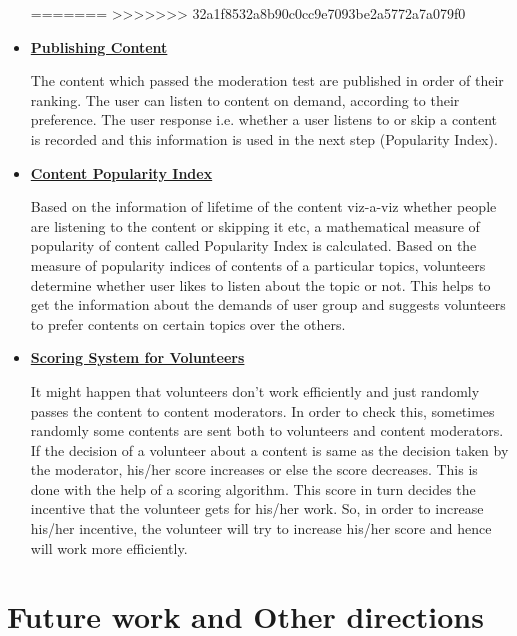 \documentclass[11pt]{article}
\begin{document}
\begin{itemize}
\begin{itemize}
		\end{itemize}
=======
>>>>>>> 32a1f8532a8b90c0cc9e7093be2a5772a7a079f0


			\item \textbf{\underline{Publishing Content}}


			The content which passed the moderation test are published in order of their ranking. The user can listen to content on demand, according to their preference. The user response i.e. whether a user listens to or skip a content is recorded and this information is used in the next step (Popularity Index).

\bigskip
			\item \textbf{\underline{Content Popularity Index}}


			Based on the information of lifetime of the content viz-a-viz whether people are listening to the content or skipping it etc, a mathematical measure of popularity of content called Popularity Index is calculated. Based on the measure of popularity indices of contents of a particular topics, volunteers determine whether user likes to listen about the topic or not. This helps to get the information about the demands of user group and suggests volunteers to prefer contents on certain topics over the others.


			\item \textbf{\underline{Scoring System for Volunteers}}


			It might happen that volunteers don't work efficiently and just randomly passes the content to content moderators. In order to check this, sometimes randomly some contents are sent both to volunteers and content moderators. If the decision of a volunteer about a content is same as the decision taken by the moderator, his/her score increases or else the score decreases. This is done with the help of a scoring algorithm. This score in turn decides the incentive that the volunteer gets for his/her work. So, in order to increase his/her incentive, the volunteer will try to increase his/her score and hence will work more efficiently.


		\end{itemize}

	\section{Future work and Other directions}	
\end{document}
